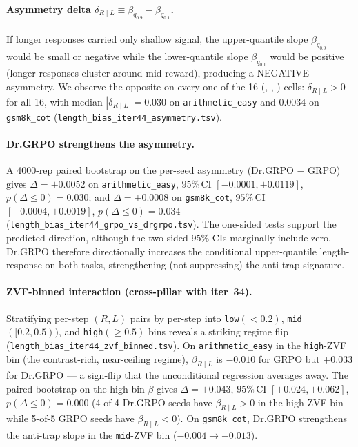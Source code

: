 \paragraph{Asymmetry delta $\delta_{R \mid L} \equiv \beta_{q_{0.9}} -
\beta_{q_{0.1}}$.}
If longer responses carried only shallow signal, the upper-quantile slope
$\beta_{q_{0.9}}$ would be small or negative while the lower-quantile slope
$\beta_{q_{0.1}}$ would be positive (longer responses cluster around
mid-reward), producing a NEGATIVE asymmetry. We observe the opposite on every
one of the 16 (\task, \algo, \seed) cells: $\delta_{R \mid L} > 0$ for all
16, with median $|\delta_{R \mid L}| = 0.030$ on \texttt{arithmetic\_easy}
and $0.0034$ on \texttt{gsm8k\_cot} (\texttt{length\_bias\_iter44\_asymmetry.tsv}).

\paragraph{Dr.GRPO strengthens the asymmetry.}
A 4000-rep paired bootstrap on the per-seed asymmetry (Dr.GRPO $-$ GRPO)
gives $\Delta = +0.0052$ on \texttt{arithmetic\_easy}, $95\%$\,CI
$[-0.0001, +0.0119]$, $p(\Delta \le 0) = 0.030$; and $\Delta = +0.0008$ on
\texttt{gsm8k\_cot}, $95\%$\,CI $[-0.0004, +0.0019]$, $p(\Delta \le 0) =
0.034$ (\texttt{length\_bias\_iter44\_grpo\_vs\_drgrpo.tsv}). The one-sided
tests support the predicted direction, although the two-sided 95\% CIs
marginally include zero. Dr.GRPO therefore directionally
increases the conditional upper-quantile length-response on both tasks,
strengthening (not suppressing) the anti-trap signature.

\paragraph{ZVF-binned interaction (cross-pillar with iter~34).}
Stratifying per-step $(R, L)$ pairs by per-step \zvf{} into
\texttt{low}$(<\!0.2)$, \texttt{mid}$([0.2, 0.5))$, and
\texttt{high}$(\ge\!0.5)$ bins reveals a striking regime flip
(\texttt{length\_bias\_iter44\_zvf\_binned.tsv}). On \texttt{arithmetic\_easy}
in the \texttt{high}-ZVF bin (the contrast-rich, near-ceiling regime),
$\beta_{R \mid L}$ is $-0.010$ for GRPO but $+0.033$ for Dr.GRPO --- a
sign-flip that the unconditional regression averages away. The paired bootstrap
on the high-bin $\beta$ gives $\Delta = +0.043$, $95\%$\,CI
$[+0.024, +0.062]$, $p(\Delta \le 0) = 0.000$ (4-of-4 Dr.GRPO seeds have
$\beta_{R \mid L} > 0$ in the high-ZVF bin while 5-of-5 GRPO seeds have
$\beta_{R \mid L} < 0$). On \texttt{gsm8k\_cot}, Dr.GRPO strengthens the
anti-trap slope in the \texttt{mid}-ZVF bin ($-0.004 \to -0.013$).

